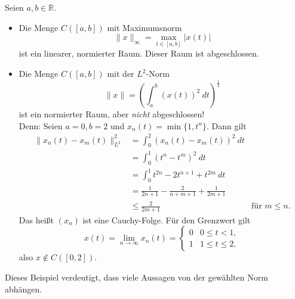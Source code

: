 \documentclass[main.tex]{subfiles}
\begin{document}
\begin{bsp}\label{1.5}
Seien $a,b \in ℝ$.
\begin{itemize}
    \item Die Menge $C([a,b])$ mit Maximumsnorm
$$\| x\|_{\infty} = \max_{t\in [a,b]} |x(t)|$$
ist ein linearer, normierter Raum. Dieser Raum ist abgeschlossen.
    \item Die Menge $C([a,b])$ mit der $L^2$-Norm
    $$\| x \| = \left( \int_a^b \left( x(t) \right)^2 ~dt \right)^{\frac{1}{2}}$$
    ist ein normierter Raum, aber \emph{nicht} abgeschlossen! \\
    Denn: Seien $a=0,b=2$ und $x_n(t) = \min\{1, t^n\}$. Dann gilt
    \begin{align*}
        \| x_n(t) - x_m (t) \|^2_{L^2} &= \int_0^2 \left( x_n(t) - x_m(t) \right)^2~dt \\
        &= \int_0^1 \left( t^n - t^m \right)^2~dt \\
        &= \int_0^1 t^{2n} - 2t^{n+1} + t^{2m}~dt \\
        &= \frac{1}{2n+1} - \frac{2}{n+m+1} + \frac{1}{2m+1} \\
        &\le \frac{2}{2m+1}&\text{für $m\le n$.}
    \end{align*}
    Das heißt $(x_n)$ ist eine Cauchy-Folge. Für den Grenzwert gilt
    $$
    x(t) = \lim_{n\to \infty} x_n(t) = \begin{cases}
    0&0\le t < 1,\\
    1 & 1\le t \le 2,\end{cases}
    $$
    also $x\notin C( [0,2])$.
\end{itemize}
Dieses Beispiel verdeutigt, dass viele Aussagen von der gewählten Norm abhängen.
\end{bsp}
\end{document}
